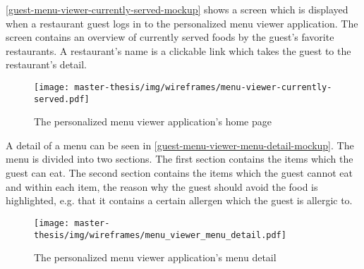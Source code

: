 \autoref{guest-menu-viewer-currently-served-mockup} shows a screen which is displayed when a restaurant guest logs in to the personalized menu viewer application.
The screen contains an overview of currently served foods by the guest's favorite restaurants.
A restaurant's name is a clickable link which takes the guest to the restaurant's detail.

\begin{figure}[h]
  \centering
  \texttt{[image: master-thesis/img/wireframes/menu-viewer-currently-served.pdf]}
  \caption{The personalized menu viewer application's home page}\label{guest-menu-viewer-currently-served-mockup}
\end{figure}

A detail of a menu can be seen in \autoref{guest-menu-viewer-menu-detail-mockup}.
The menu is divided into two sections.
The first section contains the items which the guest can eat.
The second section contains the items which the guest cannot eat and within each item, the reason why the guest should avoid the food is highlighted, e.g. that it contains a certain allergen which the guest is allergic to.

\begin{figure}[h]
  \centering
  \texttt{[image: master-thesis/img/wireframes/menu\_viewer\_menu\_detail.pdf]}
  \caption{The personalized menu viewer application's menu detail}\label{guest-menu-viewer-menu-detail-mockup}
\end{figure}
